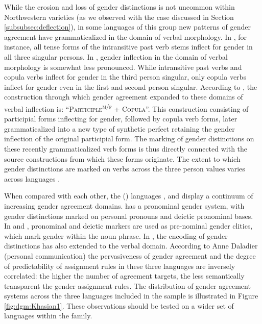 \documentclass[output=collectionpaper]{langsci/langscibook}
\begin{document}
While the erosion and loss of gender distinctions is not uncommon within Northwestern  varieties (as we observed with the  case discussed in Section \ref{subsubsec:deflection}), in some languages of this group new patterns of gender agreement have grammaticalized in the domain of verbal morphology. In , for instance, all tense forms of the intransitive past verb stems inflect for gender in all three singular persons. In , gender inflection in the domain of verbal morphology is somewhat less pronounced. While intransitive past verbs and copula verbs inflect for gender in the third person singular, only copula verbs inflect for gender even in the first and second person singular. According to \citet{Stilotoappear}, the construction through which gender agreement expanded to these domains of verbal inflection is: ``\textsc{Participle}\textsuperscript{\textsc{m/f}} + \textsc{Copula}''. This construction consisting of participial forms  inflecting for gender, followed by copula verb forms, later grammaticalized into a new type of synthetic perfect retaining the gender inflection of the original participial form.  The marking of gender distinctions on these recently grammaticalized verb forms is thus directly connected with the source constructions from which these forms originate. The extent to which gender distinctions are marked on verbs across the three person values varies across languages \citep[29]{Stilotoappear}.

When compared with each other, the  () languages ,  and  display a continuum of increasing gender agreement domains.  has a pronominal gender system, with gender distinctions marked on personal pronouns and deictic pronominal bases. In  and , pronominal and deictic markers are used as pre-nominal gender clitics, which mark gender within the noun phrase. In , the encoding of gender distinctions has also extended to the verbal domain. According to Anne Daladier (personal communication) the pervasiveness of gender agreement and the degree of predictability of assignment rules in these three languages are inversely correlated: the higher the number of agreement targets, the less semantically transparent the gender assignment rules. The distribution of gender agreement systems across the three  languages included in the sample is illustrated in Figure \ref{fig:dgm:Khasian1}. These observations should be tested on a wider set of languages within the family.
\end{document}

